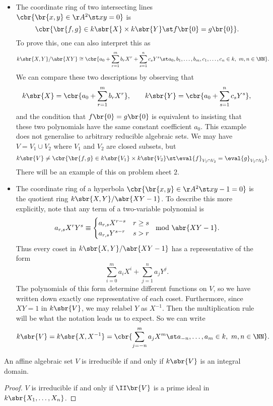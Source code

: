 \begin{example*}
\begin{itemize}
\item The coordinate ring of two intersecting lines $ \cbr{\br{x, y} \in \AA^2 \st xy = 0} $ is
$$ \cbr{\br{f, g} \in k\sbr{X} \times k\sbr{Y} \st f\br{0} = g\br{0}}. $$
To prove this, one can also interpret this as
$$ k\sbr{X, Y} / \abr{XY} \cong \cbr{a_0 + \sum_{r = 1}^m b_rX^r + \sum_{s = 1}^n c_sY^s \st a_0, b_1, \dots, b_m, c_1, \dots, c_n \in k, \ m, n \in \NN}. $$
We can compare these two descriptions by observing that
$$ k\sbr{X} = \cbr{a_0 + \sum_{r = 1}^m b_rX^r}, \qquad k\sbr{Y} = \cbr{a_0 + \sum_{s = 1}^n c_sY^s}, $$
and the condition that $ f\br{0} = g\br{0} $ is equivalent to insisting that these two polynomials have the same constant coefficient $ a_0 $. This example does not generalise to arbitrary reducible algebraic sets. We may have $ V = V_1 \cup V_2 $ where $ V_1 $ and $ V_2 $ are closed subsets, but
$$ k\sbr{V} \ne \cbr{\br{f, g} \in k\sbr{V_1} \times k\sbr{V_2} \st \eval{f}_{V_1 \cap V_2} = \eval{g}_{V_1 \cap V_2}}. $$
There will be an example of this on problem sheet $ 2 $.
\item The coordinate ring of a hyperbola $ \cbr{\br{x, y} \in \AA^2 \st xy - 1 = 0} $ is the quotient ring $ k\sbr{X, Y} / \abr{XY - 1} $. To describe this more explicitly, note that any term of a two-variable polynomial is
$$ a_{r, s}X^rY^s \equiv
\begin{cases}
a_{r, s}X^{r - s} & r \ge s \\
a_{r, s}Y^{s - r} & s > r
\end{cases}
\mod \abr{XY - 1}.
$$
Thus every coset in $ k\sbr{X, Y} / \abr{XY - 1} $ has a representative of the form
$$ \sum_{i = 0}^m a_iX^i + \sum_{j = 1}^n a_jY^j. $$
The polynomials of this form determine different functions on $ V $, so we have written down exactly one representative of each coset. Furthermore, since $ XY = 1 $ in $ k\sbr{V} $, we may relabel $ Y $ as $ X^{-1} $. Then the multiplication rule will be what the notation leads us to expect. So we can write
$$ k\sbr{V} = k\sbr{X, X^{-1}} = \cbr{\sum_{j = -n}^m a_jX^m \st a_{-n}, \dots, a_m \in k, \ m, n \in \NN}. $$
\end{itemize}
\end{example*}

\begin{lemma}
An affine algebraic set $ V $ is irreducible if and only if $ k\sbr{V} $ is an integral domain.
\end{lemma}

\begin{proof}
$ V $ is irreducible if and only if $ \II\br{V} $ is a prime ideal in $ k\sbr{X_1, \dots, X_n} $.
\end{proof}

